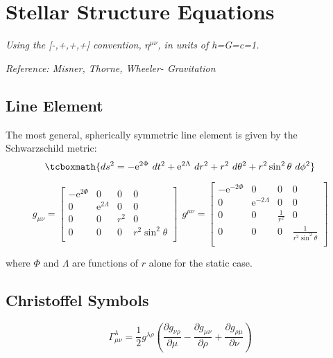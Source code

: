 \documentclass[12pt, letterpaper]{report}
\begin{document}
\tableofcontents

\chapter{Stellar Structure Equations}

\emph{Using the [-,+,+,+] convention, $\eta^{\mu\nu}$, in units of h=G=c=1.}

\emph{Reference: Misner, Thorne, Wheeler- Gravitation}


\section{Line Element}

The most general, spherically symmetric line element is given by the Schwarzschild metric: 
\begin{equation}
    \tcboxmath{ds^2= -\mathrm{e}^{2\Phi}\ dt^2+ \mathrm{e}^{2\Lambda}\ dr^2+r^2\ d\theta^2+r^2\sin^2\theta\ d\phi^2}\label{eq1.1}
\end{equation}

\[
g_{\mu\nu}= \begin{bmatrix}
    -\mathrm{e}^{2\Phi} & 0 & 0 & 0 \\
    0 & \mathrm{e}^{2\Lambda} & 0 & 0 \\
    0 & 0 & r^2 & 0 \\
    0 & 0 & 0 & r^2\sin^2\theta \\
\end{bmatrix}\ \  
g^{\mu\nu}= \begin{bmatrix}
    -\mathrm{e}^{-2\Phi} & 0 & 0 & 0 \\
    0 & \mathrm{e}^{-2\Lambda} & 0 & 0 \\
    0 & 0 & \frac{1}{r^2} & 0 \\
    0 & 0 & 0 & \frac{1}{r^2\sin^2\theta} \\
\end{bmatrix}
\]

where $\Phi$ and $\Lambda$ are functions of $r$ alone for the static case.

\section{Christoffel Symbols}

$$\Gamma ^{\lambda }_{\mu \nu }=\frac{1}{2} g^{\lambda \rho }\left(\frac{\partial g_{\nu \rho }}{\partial \mu }-\frac{\partial g_{\mu \nu }}{\partial \rho }+\frac{\partial g_{\rho \mu }}{\partial \nu }\right)$$
\end{document}
